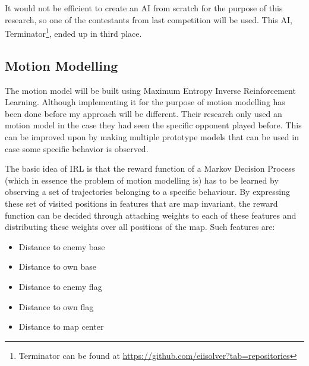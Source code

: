 \documentclass[a4paper, 12pt]{article}
\begin{document}
It would not be efficient to create an AI from scratch for the purpose of
this research, so one of the contestants from last competition will be
used. This AI, Terminator\footnote{Terminator can be found at
\url{https://github.com/eiisolver?tab=repositories}}, ended up in third place.

\subsection{Motion Modelling}
The motion model will be built using Maximum Entropy Inverse Reinforcement
Learning. Although implementing it for the purpose of motion modelling has been done before
\citep{6374144} my approach will be different. Their research
only used an motion model in the case they had seen the specific
opponent played before. This can be improved upon by making multiple prototype
models that can be used in case some specific behavior is observed. 

The basic idea of IRL is that the reward function of a Markov Decision Process
(which in essence the problem of motion modelling is) has to be learned by
observing a set of trajectories belonging to a specific behaviour. 
By expressing these set of visited positions in
features that are map invariant, the reward function can be decided through
attaching weights to each of these features and distributing these weights over
all positions of the map. Such features are:

\begin{itemize}
    \item Distance to enemy base
    \item Distance to own base
    \item Distance to enemy flag
    \item Distance to own flag
    \item Distance to map center
\end{itemize}
\end{document}

